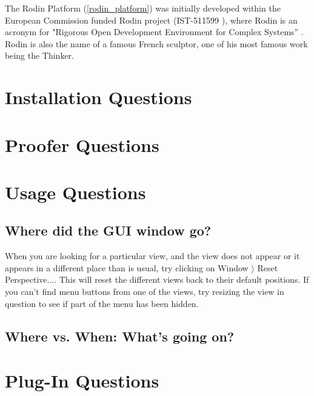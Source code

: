 The Rodin Platform (\ref{rodin_platform}) was initially developed within the European Commission funded Rodin project (IST-511599 ), where Rodin is an acronym for "Rigorous Open Development Environment for Complex Systems” . Rodin is also the name of a famous French sculptor, one of his most famous work being the Thinker. 

\section{Installation Questions}

\section{Proofer Questions}

\section{Usage Questions}

\subsection{Where did the GUI window go?}

When you are looking for a particular view, and the view does not appear or it appears in a different place than is usual, try clicking on \textsf{Window $\rangle $ Reset Perspective...}. This will reset the different views back to their default positions. If you can't find menu buttons from one of the views, try resizing the view in question to see if part of the menu has been hidden.

\subsection{Where vs. When: What's going on?}

\section{Plug-In Questions}
